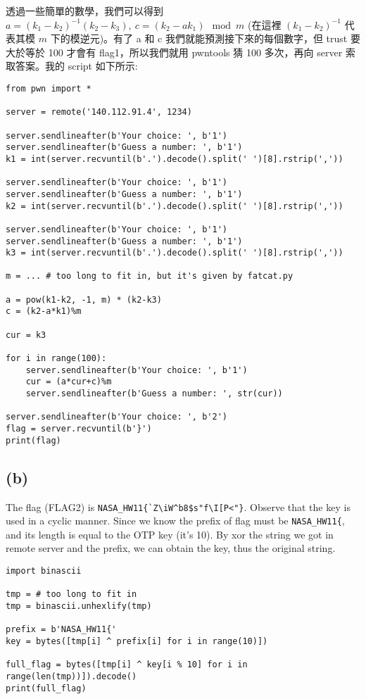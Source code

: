 \documentclass[12pt]{article}
\begin{document}
透過一些簡單的數學，我們可以得到 $a=(k_1-k_2)^{-1}(k_2-k_3),\ c=(k_2-ak_1)\mod{m}$ (在這裡 $(k_1-k_2)^{-1}$ 代表其模 $m$ 下的模逆元)。有了 a 和 c 我們就能預測接下來的每個數字，但 trust 要大於等於 100 才會有 flag1，所以我們就用 pwntools 猜 100 多次，再向 server 索取答案。我的 script 如下所示:
\begin{verbatim}
from pwn import *

server = remote('140.112.91.4', 1234)

server.sendlineafter(b'Your choice: ', b'1')
server.sendlineafter(b'Guess a number: ', b'1')
k1 = int(server.recvuntil(b'.').decode().split(' ')[8].rstrip(','))

server.sendlineafter(b'Your choice: ', b'1')
server.sendlineafter(b'Guess a number: ', b'1')
k2 = int(server.recvuntil(b'.').decode().split(' ')[8].rstrip(','))

server.sendlineafter(b'Your choice: ', b'1')
server.sendlineafter(b'Guess a number: ', b'1')
k3 = int(server.recvuntil(b'.').decode().split(' ')[8].rstrip(','))

m = ... # too long to fit in, but it's given by fatcat.py

a = pow(k1-k2, -1, m) * (k2-k3)
c = (k2-a*k1)%m

cur = k3

for i in range(100):
    server.sendlineafter(b'Your choice: ', b'1')
    cur = (a*cur+c)%m
    server.sendlineafter(b'Guess a number: ', str(cur))

server.sendlineafter(b'Your choice: ', b'2')
flag = server.recvuntil(b'}')
print(flag)
\end{verbatim}
\subsection*{(b)}
The flag (FLAG2) is \verb|NASA_HW11{`Z\iW^b8$s"f\I[P<"}|. Observe that the key is used in a cyclic manner. Since we know the prefix of flag must be \verb|NASA_HW11{|, and its length is equal to the OTP key (it's 10). By xor the string we got in remote server and the prefix, we can obtain the key, thus the original string.
\begin{verbatim}
import binascii

tmp = # too long to fit in
tmp = binascii.unhexlify(tmp)

prefix = b'NASA_HW11{'
key = bytes([tmp[i] ^ prefix[i] for i in range(10)])

full_flag = bytes([tmp[i] ^ key[i % 10] for i in range(len(tmp))]).decode()
print(full_flag)
\end{verbatim}
\end{document}
